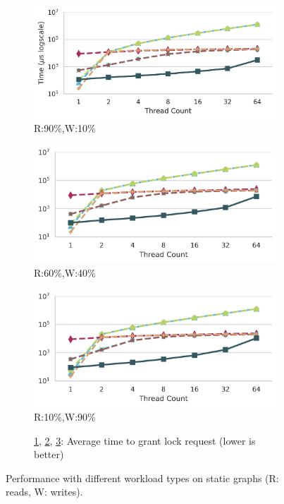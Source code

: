 \begin{figure}[ht]
	\begin{subfigure}[b]{.33\textwidth}
		\includegraphics[width=\textwidth]{figures/PerformanceCharts/ReadWithoutModificationsIdleness}
		\caption{R:90\%,W:10\%}
		\label{irwm}
	\end{subfigure}
	\begin{subfigure}[b]{.32\textwidth}
		\includegraphics[width=\textwidth]{figures/PerformanceCharts/BalancedWithoutModificationsIdleness}
		\caption{R:60\%,W:40\%}
		\label{ibwm}
	\end{subfigure}
	\begin{subfigure}[b]{.32\textwidth}
		\includegraphics[width=\textwidth]{figures/PerformanceCharts/WriteWithoutModificationsIdleness}
		\caption{R:10\%,W:90\%}
		\label{iwwm}
	\end{subfigure}
	\begin{subfigure}[b]{\textwidth}
		\caption*{\ref{irwm}, \ref{ibwm}, \ref{iwwm}: Average time to grant lock request (lower is better)}
	\end{subfigure}



	\caption{Performance with different workload types on static graphs (R: reads, W: writes).}
	\label{staticPerf}
	\end{figure}
